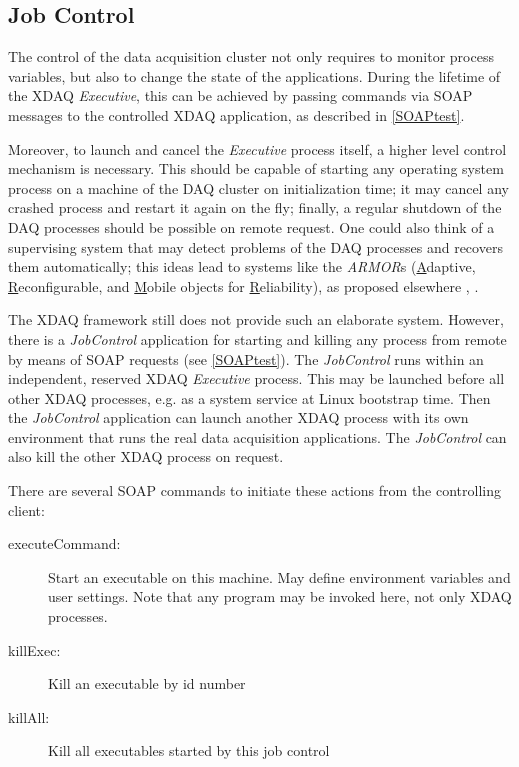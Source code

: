 \subsection{Job Control}
\label{XDAQ-JobControl}
The control of the data acquisition cluster not only requires to monitor
process variables, but also to change the state of the applications.
During the lifetime of the XDAQ {\em Executive}, this can be achieved by
passing commands via SOAP messages to the controlled XDAQ application, 
as described in \ref{SOAPtest}.

Moreover, to launch and cancel the {\em Executive} process itself,
a higher level control mechanism is necessary. This should be capable
of starting any operating system process on a machine of the DAQ cluster 
on initialization time; it may cancel any crashed process and restart it again
on the fly; finally, a regular shutdown of the DAQ processes should be
possible on remote request. One could also think of a supervising system
that may detect problems of the DAQ processes and recovers them automatically;
this ideas lead to systems like the  {\em ARMOR}s (\underline{A}daptive, 
\underline{R}econfigurable,
and \underline{M}obile objects for \underline{R}eliability), as 
proposed elsewhere \cite{Armor-paper}, \cite{Armor-survey}.

The XDAQ framework still does not provide such an elaborate system.
However, there is a {\em JobControl} application \cite{XDAQ-wiki} for starting and killing
any process from remote by means of SOAP requests (see \ref{SOAPtest}).
The {\em JobControl} runs within an independent, reserved XDAQ {\em Executive} process.
This may be launched before all other XDAQ processes, e.g. as a system service at Linux bootstrap time. 
Then the {\em JobControl} application can launch another XDAQ process with its own environment
that runs the real data acquisition applications. The {\em JobControl} can also kill the
other XDAQ process on request. 

There are several SOAP commands to initiate these actions from the controlling client:

\begin{description}

\item[executeCommand:] Start an executable on this machine. May define environment variables
and user settings. Note that any program may be invoked here, not only XDAQ processes.  

\item[killExec:] Kill an executable by id number

\item[killAll:] Kill all executables started by this job control 
 
 \end{description}

